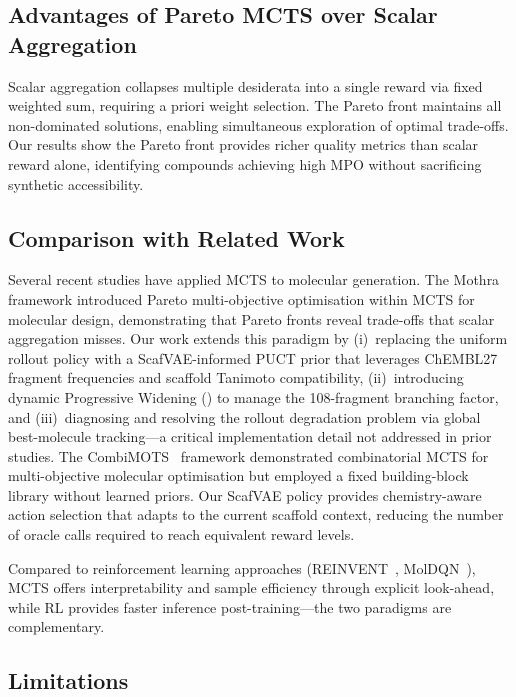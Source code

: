 \documentclass[jcim,article,layout=manuscript]{achemso}
\begin{document}
\subsection{Advantages of Pareto MCTS over Scalar Aggregation}

Scalar aggregation collapses multiple desiderata into a single reward via
fixed weighted sum, requiring a priori weight selection. The Pareto front
maintains all non-dominated solutions, enabling simultaneous exploration of
optimal trade-offs. Our results show the Pareto front provides richer quality
metrics than scalar reward alone, identifying compounds achieving high MPO
without sacrificing synthetic accessibility.

\subsection{Comparison with Related Work}

Several recent studies have applied MCTS to molecular generation. The
Mothra~\cite{Mothra2024} framework introduced Pareto multi-objective
optimisation within MCTS for molecular design, demonstrating that
Pareto fronts reveal trade-offs that scalar aggregation misses. Our work
extends this paradigm by (i)~replacing the uniform rollout policy with
a ScafVAE-informed PUCT prior that leverages ChEMBL27 fragment frequencies
and scaffold Tanimoto compatibility, (ii)~introducing dynamic Progressive
Widening () to manage the 108-fragment branching factor, and (iii)~diagnosing
and resolving the rollout degradation problem via global best-molecule
tracking---a critical implementation detail not addressed in prior studies.
The CombiMOTS~\cite{CombiMOTS2026} framework demonstrated combinatorial
MCTS for multi-objective molecular optimisation but employed a fixed
building-block library without learned priors. Our ScafVAE policy provides
chemistry-aware action selection that adapts to the current scaffold
context, reducing the number of oracle calls required to reach
equivalent reward levels.

Compared to reinforcement learning approaches (REINVENT~\cite{Olivecrona2017},
MolDQN~\cite{Zhou2019}), MCTS offers interpretability and sample efficiency
through explicit look-ahead, while RL provides faster inference
post-training---the two paradigms are complementary.
\subsection{Limitations}
\end{document}
